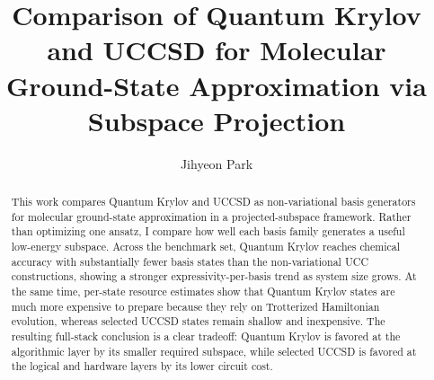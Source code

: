 \documentclass[%
 reprint,
 amsmath,amssymb,
 aps,
 floatfix,
]{revtex4-2}
\begin{document}

\title{Comparison of Quantum Krylov and UCCSD for Molecular Ground-State Approximation via Subspace Projection}

\author{Jihyeon Park}


\begin{abstract}
This work compares Quantum Krylov and UCCSD as non-variational basis generators for
molecular ground-state approximation in a projected-subspace framework. Rather
than optimizing one ansatz, I compare how well each basis family generates a
useful low-energy subspace. Across the benchmark set, Quantum Krylov reaches chemical accuracy with
substantially fewer basis states than the non-variational UCC constructions,
showing a stronger expressivity-per-basis trend as system size grows. At the
same time, per-state resource estimates show that Quantum Krylov states are much more
expensive to prepare because they rely on Trotterized Hamiltonian evolution,
whereas selected UCCSD states remain shallow and inexpensive. The resulting
full-stack conclusion is a clear tradeoff: Quantum Krylov is favored at the algorithmic
layer by its smaller required subspace, while selected UCCSD is favored at the
logical and hardware layers by its lower circuit cost.
\end{abstract}

\maketitle









\clearpage

\end{document}
